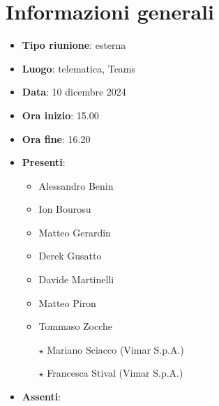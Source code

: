 \section{Informazioni generali}
\begin{itemize}
  \item \textbf{Tipo riunione}: esterna
  \item \textbf{Luogo}: telematica, Teams
  \item \textbf{Data}: 10 dicembre 2024
  \item \textbf{Ora inizio}: 15.00
  \item \textbf{Ora fine}: 16.20
  
  \item \textbf{Presenti}:
  \begin{itemize}
    \item Alessandro Benin
    \item Ion Bourosu
    \item Matteo Gerardin
    \item Derek Gusatto
    \item Davide Martinelli
    \item Matteo Piron
    \item Tommaso Zocche
    \item[$\star$] Mariano Sciacco (Vimar S.p.A.)
    \item[$\star$] Francesca Stival (Vimar S.p.A.)
  \end{itemize}

  \item \textbf{Assenti}:
 
\end{itemize}
